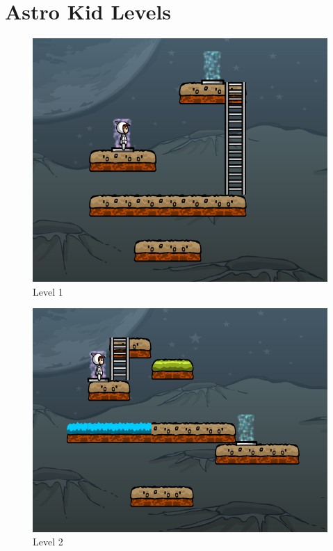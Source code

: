 \section{Astro Kid Levels}
\begin{figure}
	\centering
	
	\caption{Level 1}
	\label{level1}
	
	\includegraphics[width=1.0\textwidth]{appendix/img/lvl1}
\end{figure}
\begin{figure}
	\centering
	
	\caption{Level 2}
	\label{level2}
	
	\includegraphics[width=1.0\textwidth]{appendix/img/lvl2}
\end{figure}
